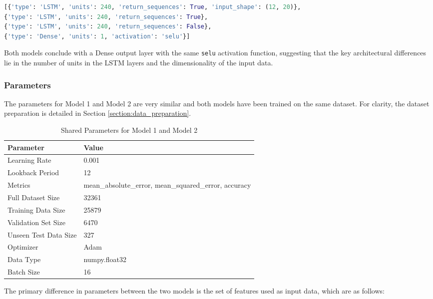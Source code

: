 \begin{lstlisting}[language=python, caption={Model 2 Structure (clean-mare-368)}, label={lst:model_2_architecture}]
[{'type': 'LSTM', 'units': 240, 'return_sequences': True, 'input_shape': (12, 20)}, 
{'type': 'LSTM', 'units': 240, 'return_sequences': True}, 
{'type': 'LSTM', 'units': 240, 'return_sequences': False}, 
{'type': 'Dense', 'units': 1, 'activation': 'selu'}]
\end{lstlisting}

Both models conclude with a Dense output layer with the same \texttt{selu} activation function, suggesting that the key architectural differences lie in the number of units in the LSTM layers and the dimensionality of the input data.

\subsubsection{Parameters}

The parameters for Model 1 and Model 2 are very similar and both models have been trained on the same dataset. For clarity, the dataset preparation is detailed in Section \ref{section:data_preparation}.

\begin{table}[h!]
\centering
\begin{tabular}{|l|l|}
\hline
\textbf{Parameter} & \textbf{Value} \\
\hline
Learning Rate & 0.001 \\
\hline
Lookback Period & 12 \\
\hline
Metrics & mean\_absolute\_error, mean\_squared\_error, accuracy \\
\hline
Full Dataset Size & 32361 \\
\hline
Training Data Size & 25879 \\
\hline
Validation Set Size & 6470 \\
\hline
Unseen Test Data Size & 327 \\
\hline
Optimizer & Adam \\
\hline
Data Type & numpy.float32 \\
\hline
Batch Size & 16 \\
\hline
\end{tabular}
\caption{Shared Parameters for Model 1 and Model 2}
\label{table:shared_parameters}
\end{table}

The primary difference in parameters between the two models is the set of features used as input data, which are as follows:

